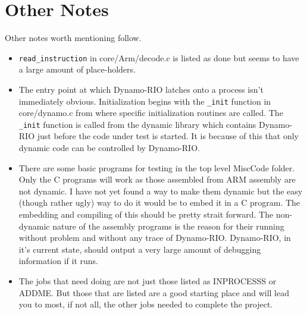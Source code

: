 \documentclass[a4paper]{article}
\begin{document}
\section{Other Notes}
Other notes worth mentioning follow.
\begin{itemize}
\item \texttt{read\_instruction} in core/Arm/decode.c is listed as done but seems to have
a large amount of place-holders.
\item The entry point at which Dynamo-RIO latches onto a process isn't immediately
obvious. Initialization begins with the \texttt{\_init} function in core/dynamo.c
from where specific initialization routines are called. The \texttt{\_init}
function is called from the dynamic library which contains Dynamo-RIO just
before the code under test is started. It is because of this that only dynamic
code can be controlled by Dynamo-RIO.
\item There are some basic programs for testing in the top level MiscCode
folder. Only the C programs will work as those assembled from ARM assembly are
not dynamic. I have not yet found a way to make them dynamic but the easy
(though rather ugly) way to do it would be to embed it in a C program. The
embedding and compiling of this should be pretty strait forward. The non-dynamic
nature of the assembly programs is the reason for their running without problem
and without any trace of Dynamo-RIO. Dynamo-RIO, in it's current state, should
output a very large amount of debugging information if it runs.
\item The jobs that need doing are not just those listed as INPROCESSS or ADDME.
But those that are listed are a good starting place and will lead you to most,
if not all, the other jobs needed to complete the project.
\end{itemize}
\end{document}
